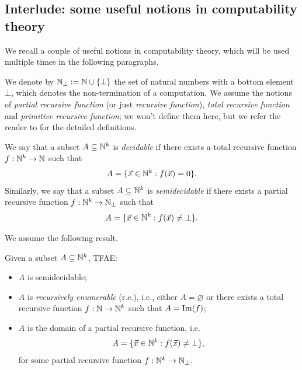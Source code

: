 \subsection*{Interlude: some useful notions in computability theory}
We recall a couple of useful notions in computability theory, which will be used multiple times in the following paragraphs.

\begin{notation}\label{idx:partial-naturals}
    We denote by $\mathbb{N}_\bot := \mathbb{N} \cup \{\bot\}$ the set of natural numbers with a bottom element $\bot$,
    which denotes the non-termination of a computation. We assume the notions of \emph{partial recursive function} (or just \emph{recursive function}),
    \emph{total recursive function} and \emph{primitive recursive function}; we won't define them here, but we refer the reader to \Cite[Definition~2.1, pp.~5--6]{Streicher2002} for the detailed definitions.
\end{notation}

\begin{definition}
    We say that a subset $A \subseteq \mathbb{N}^k$ is \emph{decidable} if there exists a total recursive function $f : \mathbb{N}^k \to \mathbb{N}$ such that
    \[ A = \{\vec x \in \mathbb{N}^k : f(\vec x) = 0\}. \]
    Similarly, we say that a subset $A \subseteq \mathbb{N}^k$ is \emph{semidecidable} if there exists a partial recursive function $f : \mathbb{N}^k \to \mathbb{N}_\bot$ such that
    \[ A = \{\vec x \in \mathbb{N}^k : f(\vec x) \ne \bot\}. \]
\end{definition}

We assume the following result.

\begin{proposition}
    Given a subset $A \subseteq \mathbb{N}^k$, TFAE:
    \begin{itemize}
        \item $A$ is semidecidable;
        \item $A$ is \emph{recursively enumerable} (r.e.), i.e., either $A = \varnothing$ or there exists a total recursive function $f : \mathbb{N} \to \mathbb{N}^k$ such that $A = \operatorname{Im}(f)$;
        \item $A$ is the domain of a partial recursive function, i.e.
        \[ A = \{\vec x \in \mathbb{N}^k : f(\vec x) \ne \bot\}, \]
        for some partial recursive function $f : \mathbb{N}^k \to \mathbb{N}_\bot$.
    \end{itemize}
\end{proposition}

